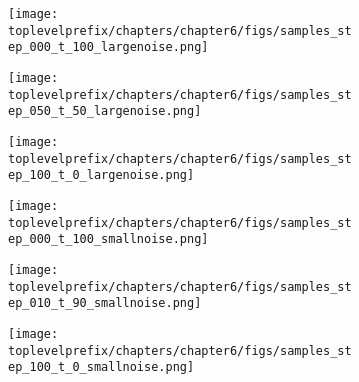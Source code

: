 \documentclass[../../book-main_ro.tex]{subfiles}
\begin{document}
\begin{example}
  \begin{figure}[tbp]
    \centering
    \begin{subfigure}{0.32\textwidth}
      \texttt{[image: \\toplevelprefix/chapters/chapter6/figs/samples\_step\_000\_t\_100\_largenoise.png]}
    \end{subfigure}
    \hfill
    \begin{subfigure}{0.32\textwidth}
      \texttt{[image: \\toplevelprefix/chapters/chapter6/figs/samples\_step\_050\_t\_50\_largenoise.png]}
    \end{subfigure}
    \hfill
    \begin{subfigure}{0.32\textwidth}
      \texttt{[image: \\toplevelprefix/chapters/chapter6/figs/samples\_step\_100\_t\_0\_largenoise.png]}
    \end{subfigure}

    \vspace{2mm} %

    \begin{subfigure}{0.32\textwidth}
      \texttt{[image: \\toplevelprefix/chapters/chapter6/figs/samples\_step\_000\_t\_100\_smallnoise.png]}
    \end{subfigure}
    \hfill
    \begin{subfigure}{0.32\textwidth}
      \texttt{[image: \\toplevelprefix/chapters/chapter6/figs/samples\_step\_010\_t\_90\_smallnoise.png]}
    \end{subfigure}
    \hfill
    \begin{subfigure}{0.32\textwidth}
      \texttt{[image: \\toplevelprefix/chapters/chapter6/figs/samples\_step\_100\_t\_0\_smallnoise.png]}
    \end{subfigure}


\end{figure}
\end{example}
\end{document}
